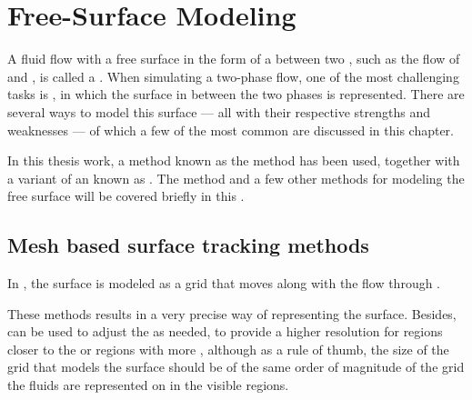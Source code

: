 \chapter{Free-Surface Modeling}
\label{chap:freesurfacemodeling}

A fluid flow with a free surface in the form of a  between two , such as the flow of \water and \air, is called a . When simulating a two-phase flow, one of the most challenging tasks is \FSM, in which the surface in between the two phases is represented. There are several ways to model this surface --- all with their respective strengths and weaknesses --- of which a few of the most common are discussed in this chapter.

In this thesis work, a method known as the \VOF method has been used, together with a variant of an  known as . The \VOF method and a few other methods for modeling the free surface will be covered briefly in this \levelname.



\section{Mesh based surface tracking methods}

In , the surface is modeled as a grid that moves along with the flow through .

These methods results in a very precise way of representing the surface. Besides,  can be used to adjust the  as needed, to provide a higher resolution for regions closer to the \camera or regions with more \turbulence, although as a rule of thumb, the size of the grid that models the surface should be of the same order of magnitude of the grid the fluids are represented on in the visible regions.


